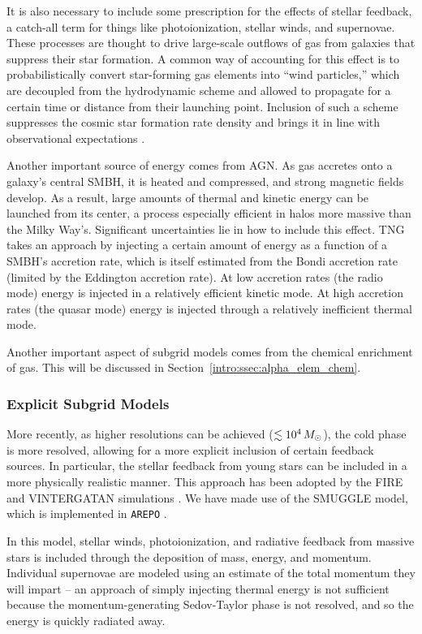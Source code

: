 It is also necessary to include some prescription for the effects of stellar feedback, a catch-all term for things like photoionization, stellar winds, and supernovae. These processes are thought to drive large-scale outflows of gas from galaxies that suppress their star formation. A common way of accounting for this effect is to probabilistically convert star-forming gas elements into ``wind particles,'' which are decoupled from the hydrodynamic scheme and allowed to propagate for a certain time or distance from their launching point. Inclusion of such a scheme suppresses the cosmic star formation rate density and brings it in line with observational expectations \citep{2003MNRAS.339..312S}.

Another important source of energy comes from AGN. As gas accretes onto a galaxy's central SMBH, it is heated and compressed, and strong magnetic fields develop. As a result, large amounts of thermal and kinetic energy can be launched from its center, a process especially efficient in halos more massive than the Milky Way's. Significant uncertainties lie in how to include this effect. TNG takes an approach by injecting a certain amount of energy as a function of a SMBH's accretion rate, which is itself estimated from the Bondi accretion rate (limited by the Eddington accretion rate). At low accretion rates (the radio mode) energy is injected in a relatively efficient kinetic mode. At high accretion rates (the quasar mode) energy is injected through a relatively inefficient thermal mode.

Another important aspect of subgrid models comes from the chemical enrichment of gas. This will be discussed in Section~\ref{intro:ssec:alpha_elem_chem}.

\subsubsection{Explicit Subgrid Models}
More recently, as higher resolutions can be achieved ($\lesssim10^4\,M_{\odot}$), the cold phase is more resolved, allowing for a more explicit inclusion of certain feedback sources. In particular, the stellar feedback from young stars can be included in a more physically realistic manner. This approach has been adopted by the FIRE \citep{2018MNRAS.480..800H} and VINTERGATAN simulations \citep{2021MNRAS.503.5826A}. We have made use of the SMUGGLE model, which is implemented in \texttt{AREPO} \citep{2019MNRAS.489.4233M}.

In this model, stellar winds, photoionization, and radiative feedback from massive stars is included through the deposition of mass, energy, and momentum. Individual supernovae are modeled using an estimate of the total momentum they will impart -- an approach of simply injecting thermal energy is not sufficient because the momentum-generating Sedov-Taylor phase is not resolved, and so the energy is quickly radiated away.

